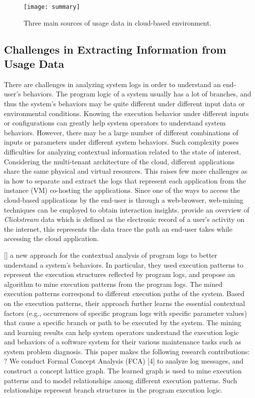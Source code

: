 \begin{figure}[t!]
	\centering
	\texttt{[image: summary]}
	\caption{Three main sources of usage data in cloud-based environment.}
	\label{fig:schema}
\end{figure}

\subsection{Challenges in Extracting Information from Usage Data}

There are challenges in analyzing system logs in order to understand an end-user’s behaviors. The program logic of a system usually has a lot of branches, and thus the system’s behaviors may be quite different under different input data or environmental conditions. Knowing the execution behavior under different inputs or configurations can greatly help system operators to understand system behaviors. However, there may be a large number of different combinations of inputs or parameters under different system behaviors. Such complexity poses difficulties for analyzing contextual information related to the state of interest. Considering the multi-tenant architecture of the cloud, different applications share the same physical and virtual resources. This raises few more challenges as in how to separate and extract the logs that represent each application from the instance (VM) co-hosting the applications. 
%
Since one of the ways to access the cloud-based applications by the end-user is through a web-browser, web-mining techniques can be employed to obtain interaction insights. \cite{Bucklin2009} provide an overview of \emph{Clickstream} data which is defined as the electronic record of a user's activity on the internet, this represents the data trace the path an end-user takes while accessing the cloud application. 

[] a new approach for the contextual analysis of program logs to better understand a system’s behaviors. In particular, they used execution patterns to represent the execution structures reflected by program logs, and propose an algorithm to mine execution patterns from the program logs. The mined execution patterns correspond to different execution paths of the system. Based on the execution patterns, their approach further learns the essential contextual factors (e.g., occurrences of specific program logs with specific parameter values) that cause a specific branch or path to be executed by the system. 
%
The mining and learning results can help system operators understand the execution logic and behaviors of a software system for their various maintenance tasks such as system problem diagnosis. This paper makes the following research contributions: ? We conduct Formal Concept Analysis (FCA) [4] to analyze log messages, and construct a concept lattice graph. The learned graph is used to mine execution patterns and to model relationships among different execution patterns. Such relationships represent branch structures in the program execution logic.

